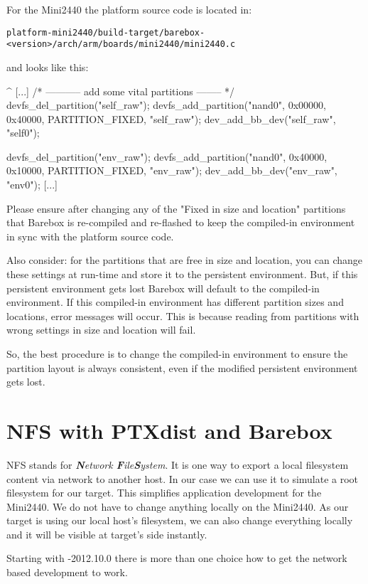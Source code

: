 For the Mini2440 the platform source code is located in:

\texttt{platform-mini2440/build-target/barebox-<version>/arch/arm/boards/mini2440/mini2440.c}

and looks like this:

\begin{ptxshell}[escapechar=|]{^}
[...]
      /* ----------- add some vital partitions -------- */
   devfs_del_partition("self_raw");
   devfs_add_partition("nand0", 0x00000, 0x40000, PARTITION_FIXED, "self_raw");
   dev_add_bb_dev("self_raw", "self0");

   devfs_del_partition("env_raw");
   devfs_add_partition("nand0", 0x40000, 0x10000, PARTITION_FIXED, "env_raw");
   dev_add_bb_dev("env_raw", "env0");
[...]
\end{ptxshell}

Please ensure after changing any of the "Fixed in size and location" partitions
that Barebox is re-compiled and re-flashed to keep the compiled-in environment
in sync with the platform source code.

Also consider: for the partitions that are free in size and location, you can
change these settings at run-time and store it to the persistent environment.
But, if this persistent environment gets lost Barebox will default to the
compiled-in environment. If this compiled-in environment has different
partition sizes and locations, error messages will occur. This is because
reading from partitions with wrong settings in size and location will fail.

So, the best procedure is to change the compiled-in environment to ensure the
partition layout is always consistent, even if the modified persistent
environment gets lost.

\section{NFS with PTXdist and Barebox}

NFS stands for \textit{\textbf{N}etwork \textbf{F}ile\textbf{S}ystem}. It is one
way to export a local filesystem content via network to another host. In our case
we can use it to simulate a root filesystem for our target. This simplifies application
development for the Mini2440. We do not have to change anything locally on the
Mini2440. As our target is using our local host's filesystem, we can also change
everything locally and it will be visible at target's side instantly.

Starting with \ptxdist{}-2012.10.0 there is more than one choice how to get
the network based development to work.

